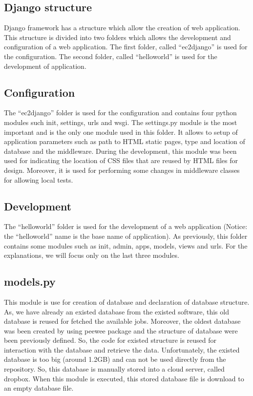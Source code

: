 \documentclass[conference,compsoc]{IEEEtran}
\begin{document}
\subsection{Django structure}
Django framework has a structure which allow the creation of web application. This structure is divided into two folders which allows the development and configuration of a web application. The first folder, called “ec2django” is used for the configuration. The second folder, called “helloworld” is used for the development of application.

\subsection{Configuration}
The “ec2django” folder is used for the configuration and contains four python modules such init, settings, urls and wsgi. The settings.py module is the most important and is the only one module used in this folder. It allows to setup of application parameters such as path to HTML static pages, type and location of database and the middleware. During the development, this module was been used for indicating the location of CSS files that are reused by HTML files for design. Moreover, it is used for performing some changes in middleware classes for allowing local tests. 

\subsection{Development}
The “helloworld” folder is used for the development of a web application (Notice: the “helloworld” name is the base name of application). As previously, this folder contains some modules such as init, admin, apps, models, views and urls. For the explanations, we will focus only on the last three modules.

\subsection{models.py}
This module is use for creation of database and declaration of database structure. As, we have already an existed database from the existed software, this old database is reused for fetched the available jobs. Moreover, the oldest database was been created by using peewee package and the structure of database were been previously defined. So, the code for existed structure is reused for interaction with the database and retrieve the data. Unfortunately, the existed database is too big (around 1.2GB) and can not be used directly from the repository. So, this database is manually stored into a cloud server, called dropbox. When this module is executed, this stored database file is download to an empty database file. 
\end{document}
